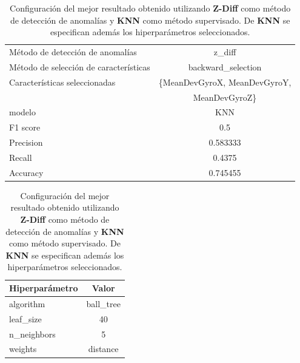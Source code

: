 \begin{appendices}
		\begin{table}[htb]
			\centering
			\caption{Configuración del mejor resultado obtenido utilizando \textbf{Z-Diff} como método de detección de anomalías y \textbf{KNN}
			como método supervisado. De \textbf{KNN} se especifican además los hiperparámetros seleccionados.}
			\label{table:18}
			\begin{tabular}{lc}
				\toprule
					  Método de detección de anomalías &                                     z\_diff \\
				Método de selección de características &                         backward\_selection \\
						 Características seleccionadas & \{MeanDevGyroX, MeanDevGyroY, \\
						 							   & 							MeanDevGyroZ\}   \\
												modelo &                                        KNN \\
											  F1 score &                                        0.5 \\
											 Precision &                                   0.583333 \\
												Recall &                                     0.4375 \\
											  Accuracy &                                   0.745455 \\
				\bottomrule
			\end{tabular}
			\newline
			\newline

			\begin{tabular}{lc}
				\toprule
				Hiperparámetro &     Valor \\
				\midrule
					 algorithm & ball\_tree \\
					 leaf\_size &        40 \\
				   n\_neighbors &         5 \\
					   weights &  distance \\
				\bottomrule
			\end{tabular}
			
		\end{table}


\end{appendices}
